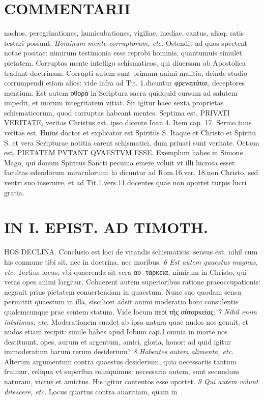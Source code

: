 \documentclass{article}
\begin{document}
\begin{pages}
\section*{COMMENTARII }
\marginpar{[ p.154 ]}\pstart nachos, peregrinationes, humicubationes, vigiliae, inediae, cantus, aliaq. satis testari possunt.  \pend
\textit{Hominum mente corruptorum, etc. }\pstart Ostendit ad quos spectent notae positae: nimirum testimonia esse reprobi hominis, quantumuis simulet pietatem. Corruptos mente intelligo schismaticos, qui diuersam ab Apostolica tradunt doctrinam. Corrupti autem sunt primum animi malitia, deinde studio corrumpendi etiam alios: vide infra ad Tit. 1.dicuntur φρεναπάται, deceptores mentium.  \pend\pstart Est autem οθορὰ in Scriptura sacra quidquid cursum ad salutem impedit, et morum integritatem vitiat. Sit igitur haec sexta proprietas schismaticorum, quod corruptas habeant mentes.  \pend\pstart Septima est, PRIVATI VERITATE, veritas Christus est, ipso dicente Ioan.4. Item cap. 17. Sermo tuus veritas est. Huius doctor et explicator est Spiritus S. Itaque et Christo et Spiritu S. et vera Scripturae notitia carent schismatici, dum priuati sunt veritate.  \pend\pstart Octaua est, PIETATEM PVTANT QVAESTVM ESSE. Exemplum habes in Simone Mago, qui donum Spiritus Sancti pecunia emere voluit vt illi lucrosa esset facultas edendorum miraculorum: hi dicuntur ad Rom.16.ver. 18.non Christo, sed ventri suo inseruire, et ad Tit.1.vers.11.docentes quae non oportet turpis lucri gratia.  \pend
\section*{IN I. EPIST. AD TIMOTH. }
\marginpar{[ p.155 ]}\pstart HOS DECLINA. Conclusio est loci de vitandis schismaticis: sensus est, nihil cum his conmune tibi sit, nec in doctrina, nec moribus.  \pend
\textit{6 Est autem quaestus magnus, etc. }\pstart Tertius locus, vbi quaerenda sit vera αὐ- τάρκεια, nimirum in Christo, qui veras opes animi largitur. Cohaerent autem superioribus ratione praeoccupationis: negauit prius pietatem conuertendam in quaestum. Nunc suo quodam sensu permittit quaestum in illa, siscilicet adsit animi moderatio boni consulentis qualemcunque prae sentem statum. Vide locum περί τῆς αὐταρκείας.  \pend
\textit{7 Nihil enim intulimus, etc, }\pstart Moderationem suadet ab ipsa natura quae nudos nos genuit, et nudos etiam recipit: simile habes apud Iobum cap.1.omnia in morte nos destituunt, opes, aurum et argentum, amici, gloria, honor: ad quid igitur immoderatum harum rerum desiderium?  \pend
\textit{8 Habentes autem alimenta, etc. }\pstart Alterum argumentum contra quaestus desiderium, quia necessariis tantum fruimur, reliqua vt superflua relinquimus: necessaria autem, sunt secundum naturam, victus et amictus. His igitur contentos esse oportet.  \pend
\textit{9 Qui autem volunt ditescere, etc. }\pstart Locus quartus contra auaritiam, quam in  \pend

\end{pages}
\end{document}
